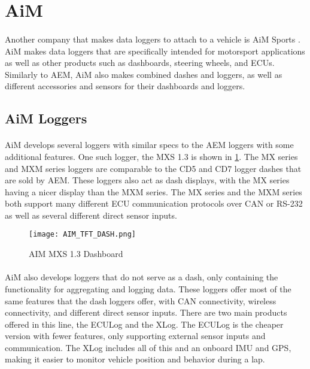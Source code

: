 \section{AiM}

\paragraph{}
Another company that makes data loggers to attach to a vehicle is AiM Sports \cite{AiMSite}.
AiM makes data loggers that are specifically intended for motorsport applications as well as other products such as dashboards, steering wheels, and ECUs.
Similarly to AEM, AiM also makes combined dashes and loggers, as well as different accessories and sensors for their dashboards and loggers.

\subsection{AiM Loggers}

\paragraph{}
AiM develops several loggers with similar specs to the AEM loggers with some additional features.
One such logger, the MXS 1.3 is shown in \cref{fig:AIM_TFT}.
The MX series and MXM series loggers are comparable to the CD5 and CD7 logger dashes that are sold by AEM.
These loggers also act as dash displays, with the MX series having a nicer display than the MXM series.
The MX series and the MXM series both support many different ECU communication protocols over CAN or RS-232 as well as several different direct sensor inputs.

\begin{figure}[H]
	\centering
	\texttt{[image: AIM\_TFT\_DASH.png]}
	\caption{AIM MXS 1.3 Dashboard}
	\label{fig:AIM_TFT}
\end{figure}

\paragraph{}
AiM also develops loggers that do not serve as a dash, only containing the functionality for aggregating and logging data.
These loggers offer most of the same features that the dash loggers offer, with CAN connectivity, wireless connectivity, and different direct sensor inputs.
There are two main products offered in this line, the ECULog and the XLog.
The ECULog is the cheaper version with fewer features, only supporting external sensor inputs and communication.
The XLog includes all of this and an onboard IMU and GPS, making it easier to monitor vehicle position and behavior during a lap.

